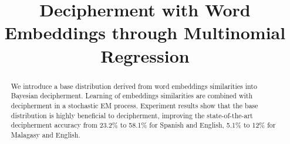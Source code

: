 \documentclass[11pt]{article}
\title{Decipherment with Word Embeddings through Multinomial Regression}
\date{}
\begin{document}
\maketitle
\begin{abstract}
We introduce a base distribution derived from word embeddings similarities into Bayesian decipherment. Learning of embeddings similarities are combined with decipherment in a stochastic EM process. Experiment results show that the base distribution is highly beneficial to decipherment, improving the state-of-the-art decipherment accuracy from 23.2\% to 58.1\% for Spanish and English, 5.1\% to 12\% for Malagasy and English. 
\end{abstract}













\end{document}
